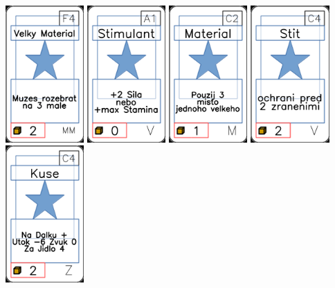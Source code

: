 \documentclass[a4paper]{article}
\begin{document}
	\includegraphics[width=3.0cm]{img-1_58}
	\includegraphics[width=3.0cm]{img-1_60}
	\includegraphics[width=3.0cm]{img-1_41}
	\includegraphics[width=3.0cm]{img-1_73}
	\includegraphics[width=3.0cm]{img-1_103}
\end{document}
